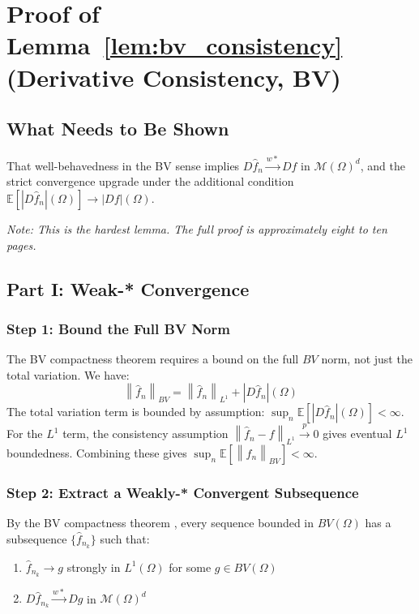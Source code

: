 \documentclass[12pt]{article}
\newcommand{\norm}[1]{\left\| #1 \right\|}
\newcommand{\E}{\mathbb{E}}
\newcommand{\Lone}{L^1(\Omega)}
\newcommand{\BV}{BV(\Omega)}
\newcommand{\cM}{\mathcal{M}(\Omega)^d}
\newcommand{\fn}{\hat{f}_n}
\newcommand{\xrightarrowp}{\xrightarrow{p}}
\begin{document}
	\section{Proof of Lemma~\ref{lem:bv_consistency}
		(Derivative Consistency, BV)}
	\label{app:lem_bv_consistency}
	
	\subsection{What Needs to Be Shown}
	
	That well-behavedness in the BV sense implies $D\fn \xrightarrow{w*} Df$
	in $\cM$, and the strict convergence upgrade under the additional condition
	$\E[|D\fn|(\Omega)] \to |Df|(\Omega)$.
	
	\textit{Note: This is the hardest lemma. The full proof is approximately
		eight to ten pages.}
	
	\subsection{Part I: Weak-* Convergence}
	
	\subsubsection*{Step 1: Bound the Full BV Norm}
	
	The BV compactness theorem requires a bound on the full $BV$ norm, not just
	the total variation. We have:
	\begin{equation}
		\norm{\fn}_{BV} = \norm{\fn}_{L^1} + |D\fn|(\Omega)
	\end{equation}
	The total variation term is bounded by assumption:
	$\sup_n \E[|D\fn|(\Omega)] < \infty$. For the $L^1$ term, the consistency
	assumption $\norm{\fn - f}_{L^1} \xrightarrowp 0$ gives eventual $L^1$
	boundedness. Combining these gives $\sup_n \E[\norm{\fn}_{BV}] < \infty$.
	
	\subsubsection*{Step 2: Extract a Weakly-* Convergent Subsequence}
	
	By the BV compactness theorem \citep[Theorem~3.23]{ambrosio2000bv}, every
	sequence bounded in $\BV$ has a subsequence $\{\hat{f}_{n_k}\}$ such that:
	\begin{enumerate}
		\item $\hat{f}_{n_k} \to g$ strongly in $\Lone$ for some $g \in \BV$
		\item $D\hat{f}_{n_k} \xrightarrow{w*} Dg$ in $\cM$
	\end{enumerate}
	
\end{document}
